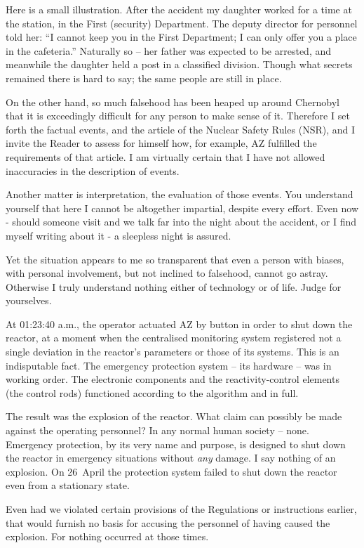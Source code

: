 \documentclass[openright]{bookest}
\begin{document}
Here is a small illustration. After the accident my daughter worked for a time at the station, in the First (security) Department. The deputy director for personnel told her: ``I cannot keep you in the First Department; I can only offer you a place in the cafeteria.'' Naturally so -- her father was expected to be arrested, and meanwhile the daughter held a post in a classified division. Though what secrets remained there is hard to say; the same people are still in place.

On the other hand, so much falsehood has been heaped up around Chernobyl that it is exceedingly difficult for any person to make sense of it. Therefore I set forth the factual events, and the article of the Nuclear Safety Rules (NSR), and I invite the Reader to assess for himself how, for example, AZ fulfilled the requirements of that article. I am virtually certain that I have not allowed inaccuracies in the description of events.

Another matter is interpretation, the evaluation of those events. You understand yourself that here I cannot be altogether impartial, despite every effort. Even now - should someone visit and we talk far into the night about the accident, or I find myself writing about it - a sleepless night is assured.

Yet the situation appears to me so transparent that even a person with biases, with personal involvement, but not inclined to falsehood, cannot go astray. Otherwise I truly understand nothing either of technology or of life. Judge for yourselves.

At 01:23:40 a.m., the operator actuated AZ by button in order to shut down the reactor, at a moment when the centralised monitoring system registered not a single deviation in the reactor's parameters or those of its systems. This is an indisputable fact. The emergency protection system -- its hardware -- was in working order. The electronic components and the reactivity-control elements (the control rods) functioned according to the algorithm and in full.

The result was the explosion of the reactor. What claim can possibly be made against the operating personnel? In any normal human society -- none. Emergency protection, by its very name and purpose, is designed to shut down the reactor in emergency situations without \textit{any} damage. I say nothing of an explosion. On 26~April the protection system failed to shut down the reactor even from a stationary state.

Even had we violated certain provisions of the Regulations or instructions earlier, that would furnish no basis for accusing the personnel of having caused the explosion. For nothing occurred at those times.
\end{document}
